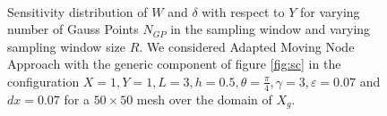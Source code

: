 \begin{figure}[ht]
\centering
{}%
     \\
    \caption{Sensitivity distribution of $W$ and $\delta$ with respect to $Y$ for varying number of Gauss Points $N_{GP}$ in the sampling window and varying sampling window size $R$. We considered Adapted Moving Node Approach with the generic component of figure \ref{fig:sc} in the configuration  $X=1,Y=1,L=3,h=0.5,\theta=\frac{\pi}{4}, \gamma=3, \varepsilon=0.07$ and  $dx=0.07$ for a $50\times50$ mesh over the domain of $X_g$.}%
    \label{fig:sensY}%
\end{figure}
